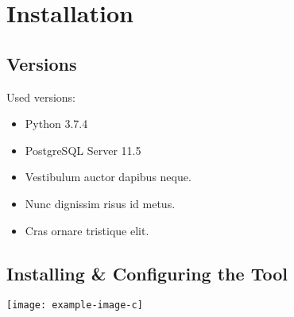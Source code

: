 \chapter{Installation}
\section{Versions}
Used versions:
\begin{itemize}
	\item Python 3.7.4
	\item PostgreSQL Server 11.5
	\item Vestibulum auctor dapibus neque.
	\item Nunc dignissim risus id metus.
	\item Cras ornare tristique elit.
\end{itemize}

\section{Installing \& Configuring the Tool}
\lipsum[3]

\noindent\texttt{[image: example-image-c]} 